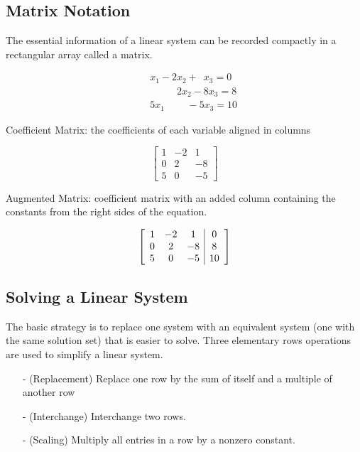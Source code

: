 \documentclass{article}
\begin{document}
\pagebreak

\subsection{Matrix Notation}

The essential information of a linear system can be recorded compactly in a rectangular array called a matrix.

\begin{align*}
    \quad & x_1 - 2x_2 + \phantom{0} x_3 = 0 \\
    \quad & \phantom{1x_1+} 2x_2 -8x_3 = 8\\
    \quad & 5x_1 \phantom{+2x_2} -5x_3 = 10
\end{align*}

Coefficient Matrix: the coefficients of each variable aligned in columns

$$\begin{bmatrix}
    1&-2&1\\
    0&2&-8\\
    5&0&-5
\end{bmatrix}$$

Augmented Matrix: coefficient matrix with an added column containing the constants from the right sides of the equation. \newline

$$\left[\begin{array}{ccc|c}
    1&-2&1&0 \\
    0&2&-8&8 \\
    5&0&-5&10 \pagebreak
\end{array}\right]$$

\subsection {Solving a Linear System}

The basic strategy is to replace one system with an equivalent system (one with the same solution set) that is easier to solve. Three elementary rows operations are used to simplify a linear system. 

\begin{itemize}
    \item[-] (Replacement) Replace one row by the sum of itself and a multiple of another row
    \item[-] (Interchange) Interchange two rows.
    \item[-] (Scaling) Multiply all entries in a row by a nonzero constant.
\end{itemize}
\end{document}

